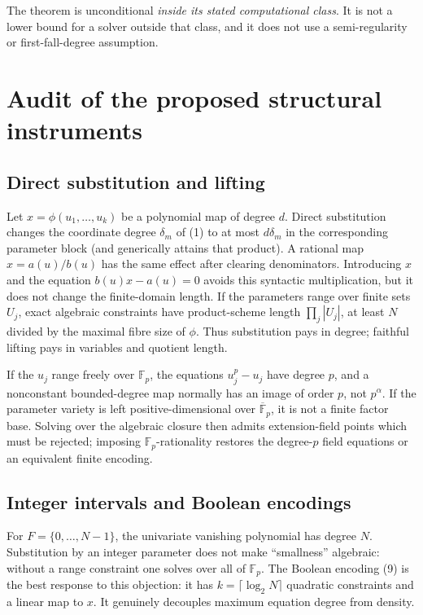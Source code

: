 \documentclass[11pt]{article}
\newcommand{\F}{\mathbb F}
\begin{document}
The theorem is unconditional \emph{inside its stated computational class}.
It is not a lower bound for a solver outside that class, and it does not use a
semi-regularity or first-fall-degree assumption.

\section{Audit of the proposed structural instruments}

\subsection{Direct substitution and lifting}

Let $x=\phi(u_1,\ldots,u_k)$ be a polynomial map of degree $d$.  Direct
substitution changes the coordinate degree $\delta_m$ of (1) to at most
$d\delta_m$ in the corresponding parameter block (and generically attains
that product).  A rational map $x=a(u)/b(u)$ has the same effect after clearing
denominators.  Introducing $x$ and the equation $b(u)x-a(u)=0$ avoids this
syntactic multiplication, but it does not change the finite-domain length.
If the parameters range over finite sets $U_j$, exact algebraic constraints
have product-scheme length $\prod_j|U_j|$, at least $N$ divided by the maximal
fibre size of $\phi$.  Thus substitution pays in degree; faithful lifting pays
in variables and quotient length.

If the $u_j$ range freely over $\F_p$, the equations $u_j^p-u_j$ have degree
$p$, and a nonconstant bounded-degree map normally has an image of order $p$,
not $p^\alpha$.  If the parameter variety is left positive-dimensional over
$\overline{\F}_p$, it is not a finite factor base.  Solving over the algebraic
closure then admits extension-field points which must be rejected; imposing
$\F_p$-rationality restores the degree-$p$ field equations or an equivalent
finite encoding.

\subsection{Integer intervals and Boolean encodings}

For $F=\{0,\ldots,N-1\}$, the univariate vanishing polynomial has degree $N$.
Substitution by an integer parameter does not make ``smallness'' algebraic:
without a range constraint one solves over all of $\F_p$.  The Boolean encoding %
(9) is the best response to this objection: it has $k=\lceil\log_2N\rceil$
quadratic constraints and a linear map to $x$.  It genuinely decouples maximum
equation degree from density.
\end{document}
